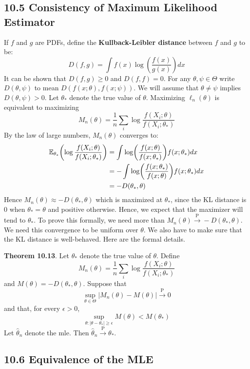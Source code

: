 \subsection*{10.5 Consistency of Maximum Likelihood
Estimator}\label{consistency-of-maximum-likelihood-estimator}
If \(f\) and \(g\) are PDFs, define the \textbf{Kullback-Leibler
distance} between \(f\) and \(g\) to be:
\[
D(f, g) = \int f(x) \log \left( \frac{f(x)}{g(x)} \right) dx
\]
It can be shown that \(D(f, g) \geq 0\) and \(D(f, f) = 0\). For any
\(\theta, \psi \in \Theta\) write \(D(\theta, \psi)\) to mean
\(D(f(x; \theta), f(x; \psi))\). We will assume that
\(\theta \neq \psi\) implies \(D(\theta, \psi) > 0\).
Let \(\theta_{*}\) denote the true value of \(\theta\). Maximizing
\(\ell_{n}(\theta)\) is equivalent to maximizing
\[
M_{n}(\theta) = \frac{1}{n} \sum_{i} \log \frac{f(X_{i}; \theta)}{f(X_{i}; \theta_{*})}
\]
By the law of large numbers, \(M_{n}(\theta)\) converges to:
\begin{align*}
\EXP_{\theta_{*}} \left( \log \frac{f(X_{i}; \theta)}{f(X_{i}; \theta_{*})} \right)
& = \int \log \left( \frac{f(x; \theta)}{f(x; \theta_{*})} \right) f(x; \theta_{*}) dx \\
& = - \int \log \left( \frac{f(x; \theta_{*})}{f(x; \theta)} \right) f(x; \theta_{*}) dx \\
&= -D(\theta_{*}, \theta)
\end{align*}
Hence \(M_{n}(\theta) \approx -D(\theta_{*}, \theta)\) which is maximized at
\(\theta_{*}\), since the KL distance is 0 when \(\theta_{*} = \theta\) and
positive otherwise. Hence, we expect that the maximizer will tend to
\(\theta_{*}\).
To prove this formally, we need more than
\(M_{n}(\theta) \xrightarrow{\textrm{P}} -D(\theta_{*}, \theta)\). We need
this convergence to be uniform over \(\theta\). We also have to make
sure that the KL distance is well-behaved. Here are the formal details.

\textbf{Theorem 10.13}. Let \(\theta_{*}\) denote the true value of
\(\theta\). Define
\[
M_{n}(\theta) = \frac{1}{n} \sum_{i} \log \frac{f(X_{i}; \theta)}{f(X_{i}; \theta_{*})}
\]
and \(M(\theta) = -D(\theta_{*}, \theta)\). Suppose that
\[
\sup _{\theta \in \Theta} |M_{n}(\theta) - M(\theta)| \xrightarrow{\textrm{P}} 0
\]
and that, for every \(\epsilon > 0\),
\[
\sup _{\theta : |\theta - \theta_{*}| \geq \epsilon} M(\theta) < M(\theta_{*})
\]
Let \(\hat{\theta}_{n}\) denote the mle. Then
\(\hat{\theta}_{n} \xrightarrow{\textrm{P}} \theta_{*}\).

\subsection*{10.6 Equivalence of the
MLE}\label{equivalence-of-the-mle}

